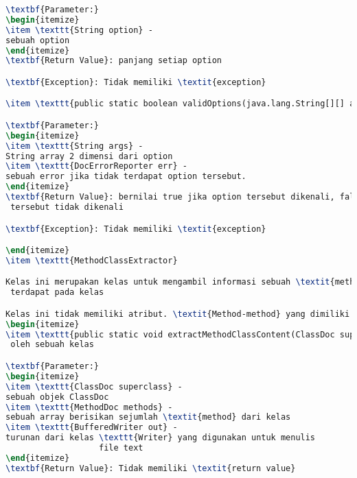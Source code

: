 \begin{lstlisting}[language=TeX, caption=Hasil Pengujian kode program perangkat lunak]
\textbf{Parameter:}
\begin{itemize}
\item \texttt{String option} - 
sebuah option
\end{itemize}
\textbf{Return Value}: panjang setiap option

\textbf{Exception}: Tidak memiliki \textit{exception}

\item \texttt{public static boolean validOptions(java.lang.String[][] args, DocErrorReporter err)}Pengecekan option valid

\textbf{Parameter:}
\begin{itemize}
\item \texttt{String args} - 
String array 2 dimensi dari option
\item \texttt{DocErrorReporter err} - 
sebuah error jika tidak terdapat option tersebut.
\end{itemize}
\textbf{Return Value}: bernilai true jika option tersebut dikenali, false jika option
 tersebut tidak dikenali

\textbf{Exception}: Tidak memiliki \textit{exception}

\end{itemize}
\item \texttt{MethodClassExtractor}

Kelas ini merupakan kelas untuk mengambil informasi sebuah \textit{method}
 terdapat pada kelas

Kelas ini tidak memiliki atribut. \textit{Method-method} yang dimiliki kelas ini adalah sebagai berikut.
\begin{itemize}
\item \texttt{public static void extractMethodClassContent(ClassDoc superclass, MethodDoc[] methods, java.io.BufferedWriter out)}\textit{Method} ini akan menampilkan \textit{method-method} yang dimiliki
 oleh sebuah kelas

\textbf{Parameter:}
\begin{itemize}
\item \texttt{ClassDoc superclass} - 
sebuah objek ClassDoc
\item \texttt{MethodDoc methods} - 
sebuah array berisikan sejumlah \textit{method} dari kelas
\item \texttt{BufferedWriter out} - 
turunan dari kelas \texttt{Writer} yang digunakan untuk menulis
                   file text
\end{itemize}
\textbf{Return Value}: Tidak memiliki \textit{return value}


\end{lstlisting}
